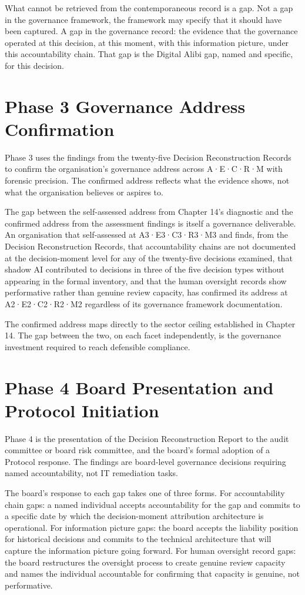 What cannot be retrieved from the contemporaneous record is a gap. Not a gap in the governance framework, the framework may specify that it should have been captured. A gap in the governance record: the evidence that the governance operated at this decision, at this moment, with this information picture, under this accountability chain. That gap is the Digital Alibi gap, named and specific, for this decision.

\section{Phase 3 Governance Address Confirmation}

Phase 3 uses the findings from the twenty-five Decision Reconstruction Records to confirm the organisation's governance address across A·E·C·R·M with forensic precision. The confirmed address reflects what the evidence shows, not what the organisation believes or aspires to.

The gap between the self-assessed address from Chapter 14's diagnostic and the confirmed address from the assessment findings is itself a governance deliverable. An organisation that self-assessed at A3·E3·C3·R3·M3 and finds, from the Decision Reconstruction Records, that accountability chains are not documented at the decision-moment level for any of the twenty-five decisions examined, that shadow AI contributed to decisions in three of the five decision types without appearing in the formal inventory, and that the human oversight records show performative rather than genuine review capacity, has confirmed its address at A2·E2·C2·R2·M2 regardless of its governance framework documentation.

The confirmed address maps directly to the sector ceiling established in Chapter 14. The gap between the two, on each facet independently, is the governance investment required to reach defensible compliance.

\section{Phase 4 Board Presentation and Protocol Initiation}

Phase 4 is the presentation of the Decision Reconstruction Report to the audit committee or board risk committee, and the board's formal adoption of a Protocol response. The findings are board-level governance decisions requiring named accountability, not IT remediation tasks.

The board's response to each gap takes one of three forms. For accountability chain gaps: a named individual accepts accountability for the gap and commits to a specific date by which the decision-moment attribution architecture is operational. For information picture gaps: the board accepts the liability position for historical decisions and commits to the technical architecture that will capture the information picture going forward. For human oversight record gaps: the board restructures the oversight process to create genuine review capacity and names the individual accountable for confirming that capacity is genuine, not performative.

